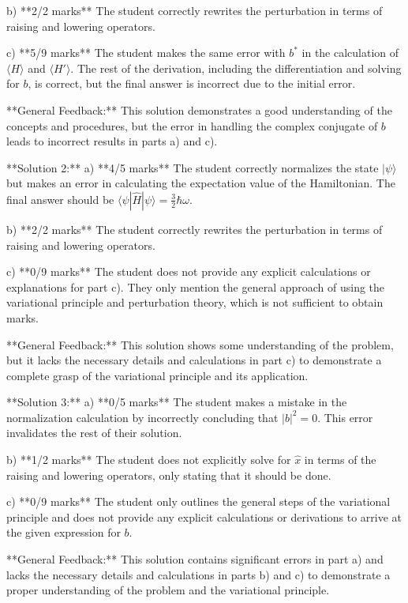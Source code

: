 \documentclass[a4paper,11pt]{article}
\begin{document}
b) **2/2 marks**
The student correctly rewrites the perturbation in terms of raising and lowering operators.

c) **5/9 marks**
The student makes the same error with \(b^*\) in the calculation of \( \langle H \rangle\) and \( \langle H' \rangle\). The rest of the derivation, including the differentiation and solving for \(b\), is correct, but the final answer is incorrect due to the initial error.

**General Feedback:** This solution demonstrates a good understanding of the concepts and procedures, but the error in handling the complex conjugate of \(b\) leads to incorrect results in parts a) and c).

**Solution 2:**
a) **4/5 marks**
The student correctly normalizes the state \(|\psi\rangle\) but makes an error in calculating the expectation value of the Hamiltonian. The final answer should be \(\langle \psi | \hat{H} | \psi \rangle = \frac{3}{2}\hbar\omega\).

b) **2/2 marks**
The student correctly rewrites the perturbation in terms of raising and lowering operators.

c) **0/9 marks**
The student does not provide any explicit calculations or explanations for part c). They only mention the general approach of using the variational principle and perturbation theory, which is not sufficient to obtain marks.

**General Feedback:** This solution shows some understanding of the problem, but it lacks the necessary details and calculations in part c) to demonstrate a complete grasp of the variational principle and its application.

**Solution 3:**
a) **0/5 marks**
The student makes a mistake in the normalization calculation by incorrectly concluding that \( |b|^2 = 0 \). This error invalidates the rest of their solution.

b) **1/2 marks**
The student does not explicitly solve for \(\hat{x}\) in terms of the raising and lowering operators, only stating that it should be done.

c) **0/9 marks**
The student only outlines the general steps of the variational principle and does not provide any explicit calculations or derivations to arrive at the given expression for \(b\).

**General Feedback:** This solution contains significant errors in part a) and lacks the necessary details and calculations in parts b) and c) to demonstrate a proper understanding of the problem and the variational principle.
\end{document}
